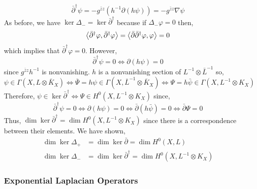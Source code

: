 \documentclass[12pt]{extarticle}
\theoremstyle{definition}
\begin{document}
\[ \bar{\partial}^\dagger \psi = - g^{\bar{z} z} \left( h^{-1} \partial (h \psi) \right) = - g^{\bar{z} z} \nabla \psi \]
As before, we have $\ker{\Delta_{-}} = \ker{\bar{\partial}^\dagger}$ because if $\Delta_{-} \varphi = 0$ then,
\[ \left< \bar{\partial}^\dagger \varphi, \bar{\partial}^\dagger \varphi \right> = \left< \bar{\partial} \bar{\partial}^\dagger \varphi, \varphi \right> = 0 \]
which implies that $\bar{\partial}^\dagger \varphi = 0$.
However,
\[ \bar{\partial}^\dagger \psi = 0 \iff \partial (h \psi) = 0 \]
since $g^{\bar{z} z} h^{-1}$ is nonvanishing. $h$ is a nonvanishing section of $L^{-1} \otimes \bar{L}^{-1}$ so,
\[ \psi \in \Gamma(X, L \otimes \bar{K}_X) \iff \bar{\Psi} = h \psi \in \Gamma(X, \bar{L}^{-1} \otimes \bar{K}_X) \iff \Psi = h \bar{\psi} \in \Gamma(X, L^{-1} \otimes K_X) \]
Therefore, $\psi \in \ker{\bar{\partial}^\dagger} \iff \Psi \in H^0(X, L^{-1} \otimes K_X)$ since,
\[ \bar{\partial}^\dagger \psi = 0 \iff \partial (h \psi) = 0 \iff \bar{\partial} (h \bar{\psi}) = 0 \iff \bar{\partial} \Psi = 0 \]
Thus, $\dim{\ker{\bar{\partial}^\dagger}} = \dim{H^0(X, L^{-1} \otimes K_X)}$ since there is a correspondence between their elements. 
We have shown,
\begin{align*}
\dim{\ker{\Delta_{+}}} & = \dim{\ker{\bar{\partial}}} = \dim{H^0(X, L)}
\\
\dim{\ker{\Delta_{-}}} & = \dim{\ker{\bar{\partial}^\dagger}} = \dim{H^0(X, L^{-1} \otimes K_X)}
\end{align*}


\subsubsection{Exponential Laplacian Operators}
\end{document}
